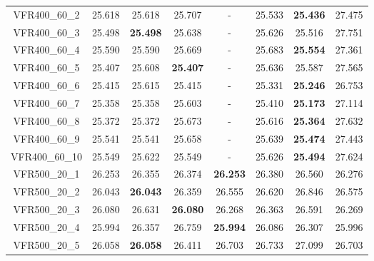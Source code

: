 \begin{tabular}{cc|ccc|ccc}
VFR400\_60\_2      & 25.618           & 25.618           & 25.707           & -                & 25.533           & {\bf 25.436}     & 27.475          \\ 
VFR400\_60\_3      & 25.498           & {\bf 25.498}     & 25.638           & -                & 25.626           & 25.516           & 27.751          \\ 
VFR400\_60\_4      & 25.590           & 25.590           & 25.669           & -                & 25.683           & {\bf 25.554}     & 27.361          \\ 
VFR400\_60\_5      & 25.407           & 25.608           & {\bf 25.407}     & -                & 25.636           & 25.587           & 27.565          \\ 
VFR400\_60\_6      & 25.415           & 25.615           & 25.415           & -                & 25.331           & {\bf 25.246}     & 26.753          \\ 
VFR400\_60\_7      & 25.358           & 25.358           & 25.603           & -                & 25.410           & {\bf 25.173}     & 27.114          \\ 
VFR400\_60\_8      & 25.372           & 25.372           & 25.673           & -                & 25.616           & {\bf 25.364}     & 27.632          \\ 
VFR400\_60\_9      & 25.541           & 25.541           & 25.658           & -                & 25.639           & {\bf 25.474}     & 27.443          \\ 
VFR400\_60\_10     & 25.549           & 25.622           & 25.549           & -                & 25.626           & {\bf 25.494}     & 27.624          \\ 
VFR500\_20\_1      & 26.253           & 26.355           & 26.374           & {\bf 26.253}     & 26.380           & 26.560           & 26.276          \\ 
VFR500\_20\_2      & 26.043           & {\bf 26.043}     & 26.359           & 26.555           & 26.620           & 26.846           & 26.575          \\ 
VFR500\_20\_3      & 26.080           & 26.631           & {\bf 26.080}     & 26.268           & 26.363           & 26.591           & 26.269          \\ 
VFR500\_20\_4      & 25.994           & 26.357           & 26.759           & {\bf 25.994}     & 26.086           & 26.307           & 25.996          \\ 
VFR500\_20\_5      & 26.058           & {\bf 26.058}     & 26.411           & 26.703           & 26.733           & 27.099           & 26.703          \\ 

\end{tabular}
